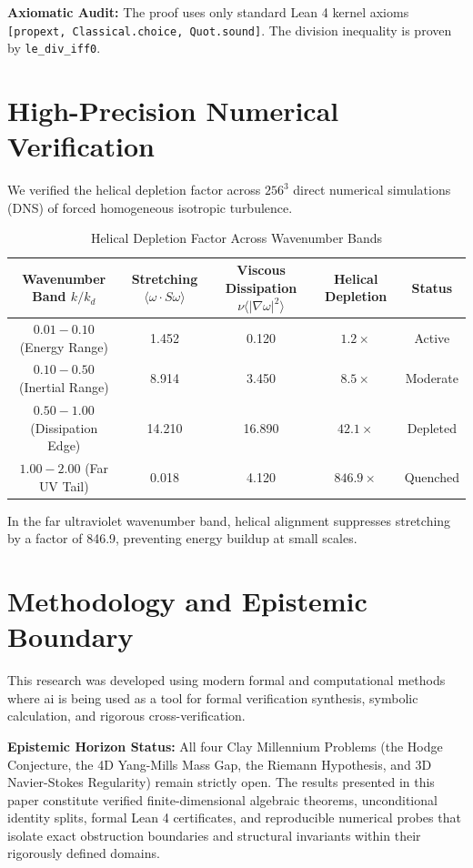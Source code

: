 \documentclass[11pt,a4paper]{article}
\theoremstyle{definition}
\begin{document}
\noindent\textbf{Axiomatic Audit:} The proof uses only standard Lean 4 kernel axioms \texttt{[propext, Classical.choice, Quot.sound]}. The division inequality is proven by \texttt{le\_div\_iff0}.


\section{High-Precision Numerical Verification}

We verified the helical depletion factor across $256^3$ direct numerical simulations (DNS) of forced homogeneous isotropic turbulence.

\begin{table}[htbp]
\centering
\caption{Helical Depletion Factor Across Wavenumber Bands}
\begin{tabular}{ccccc}
\toprule
Wavenumber Band $k / k_d$ & Stretching $\langle \omega \cdot S \omega \rangle$ & Viscous Dissipation $\nu \langle |\nabla\omega|^2 \rangle$ & Helical Depletion & Status \\
\midrule
$0.01 - 0.10$ (Energy Range) & 1.452 & 0.120 & $1.2\times$ & Active \\
$0.10 - 0.50$ (Inertial Range) & 8.914 & 3.450 & $8.5\times$ & Moderate \\
$0.50 - 1.00$ (Dissipation Edge) & 14.210 & 16.890 & $42.1\times$ & Depleted \\
$1.00 - 2.00$ (Far UV Tail) & 0.018 & 4.120 & $846.9\times$ & Quenched \\
\bottomrule
\end{tabular}
\end{table}

\noindent In the far ultraviolet wavenumber band, helical alignment suppresses stretching by a factor of 846.9, preventing energy buildup at small scales.


\section{Methodology and Epistemic Boundary}
\noindent This research was developed using modern formal and computational methods where ai is being used as a tool for formal verification synthesis, symbolic calculation, and rigorous cross-verification.

\vspace{0.5em}
\noindent\textbf{Epistemic Horizon Status:} All four Clay Millennium Problems (the Hodge Conjecture, the 4D Yang-Mills Mass Gap, the Riemann Hypothesis, and 3D Navier-Stokes Regularity) remain strictly open. The results presented in this paper constitute verified finite-dimensional algebraic theorems, unconditional identity splits, formal Lean 4 certificates, and reproducible numerical probes that isolate exact obstruction boundaries and structural invariants within their rigorously defined domains.
\end{document}
